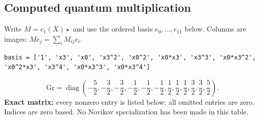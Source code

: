 \documentclass[10pt,a4paper]{article}
\begin{document}
\subsection*{Computed quantum multiplication}
Write $M=c_1(X)\star$ and use the ordered basis $e_0,\ldots,e_{11}$ below. Columns are images: $M e_j=\sum_i M_{ij}e_i$.
\begin{lstlisting}
basis = ['1', 'x3', 'x0', 'x3^2', 'x0^2', 'x0*x3', 'x3^3', 'x0*x3^2', 'x0^2*x3', 'x3^4', 'x0*x3^3', 'x0*x3^4']
\end{lstlisting}
\[\mathrm{Gr}=\operatorname{diag}\!\left(- \frac{5}{2},- \frac{3}{2},- \frac{3}{2},- \frac{1}{2},- \frac{1}{2},- \frac{1}{2},\frac{1}{2},\frac{1}{2},\frac{1}{2},\frac{3}{2},\frac{3}{2},\frac{5}{2}\right).\]
\textbf{Exact matrix:} every nonzero entry is listed below; all omitted entries are zero. Indices are zero based. No Novikov specialization has been made in this table.
\end{document}
